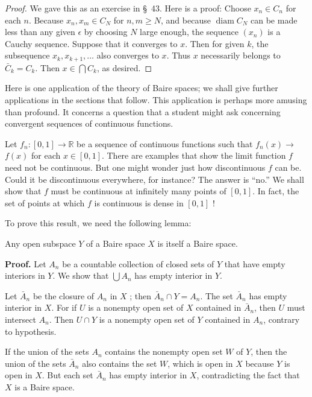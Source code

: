 \begin{proof}
We gave this as an exercise in \S\ 43. Here is a proof: Choose \(x_{n} \in {C}_{n}\) for each \(n\). Because \(x_{n},x_{m} \in {C}_{N}\) for \(n,m \geq N\), and because \(\operatorname{diam}C_{N}\) can be made less than any given \(\epsilon\) by choosing \(N\) large enough, the sequence \((x_{n})\) is a Cauchy sequence. Suppose that it converges to \(x\). Then for given \(k\), the subsequence \(x_{k},x_{k + 1},\ldots\) also converges to \(x\). Thus \(x\) necessarily belongs to \(\bar{C}_{k} = C_{k}\). Then \(x \in \bigcap {C}_{k}\), as desired.
\end{proof}
Here is one application of the theory of Baire spaces; we shall give further applications in the sections that follow. This application is perhaps more amusing than profound. It concerns a question that a student might ask concerning convergent sequences of continuous functions.

Let \(f_{n} : [ {0,1}] \rightarrow \mathbb{R}\) be a sequence of continuous functions such that \(f_{n}(x) \rightarrow\) \(f(x)\) for each \(x \in [ {0,1}]\). There are examples that show the limit function \(f\) need not be continuous. But one might wonder just how discontinuous \(f\) can be. Could it be discontinuous everywhere, for instance? The answer is ``no.'' We shall show that \(f\) must be continuous at infinitely many points of \([ {0,1}]\). In fact, the set of points at which \(f\) is continuous is dense in \([ {0,1}]\) !

To prove this result, we need the following lemma:

\begin{lemma}
\label{lem:\thetheorem}
Any open subspace \(Y\) of a Baire space \(X\) is itself a Baire space.
\end{lemma}

\textbf{Proof.} Let \(A_{n}\) be a countable collection of closed sets of \(Y\) that have empty interiors in \(Y\). We show that \(\bigcup {A}_{n}\) has empty interior in \(Y\).

Let \(\bar{A}_{n}\) be the closure of \(A_{n}\) in \(X\) ; then \(\bar{A}_{n} \cap Y = A_{n}\). The set \(\bar{A}_{n}\) has empty interior in \(X\). For if \(U\) is a nonempty open set of \(X\) contained in \(\bar{A}_{n}\), then \(U\) must intersect \(A_{n}\). Then \(U \cap Y\) is a nonempty open set of \(Y\) contained in \(A_{n}\), contrary to hypothesis.

If the union of the sets \(A_{n}\) contains the nonempty open set \(W\) of \(Y\), then the union of the sets \(\bar{A}_{n}\) also contains the set \(W\), which is open in \(X\) because \(Y\) is open in \(X\). But each set \(\bar{A}_{n}\) has empty interior in \(X\), contradicting the fact that \(X\) is a Baire space.

